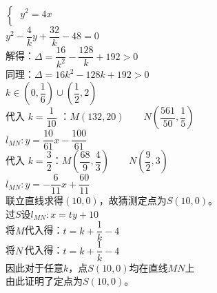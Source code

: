 \documentclass[UTF8]{ctexart}
\begin{document}
\begin{multicols}{2}
\begin{math}
\begin{cases}
                ~y^2 = 4x\\[1mm]
                \end{cases}
        \end{math}\\[5mm]
        $y^2 - \dfrac{4}{k}y + \dfrac{32}{k} - 48 = 0$\\[5mm]
        解得：$\Delta = \dfrac{16}{k^2} - \dfrac{128}{k} + 192 > 0$\\[5mm]
        同理：$\Delta = 16k^2 - 128k + 192 > 0$\\[6mm]
        $k \in (0, \dfrac{1}{6}) \cup  (\dfrac{1}{2}, 2)$\\[8mm]
        代入 $k = \dfrac{1}{10}$ ：$M(132, 20)$~~~~$N(\dfrac{561}{50}, \dfrac{1}{5})$\\[5mm]
        $l_{MN} : y = \dfrac{10}{61}x - \dfrac{100}{61}$\\[8mm]
        代入 $k = \dfrac{3}{2}$：$M(\dfrac{68}{9} , \dfrac{4}{3} )$~~~~$N(\dfrac{9}{2}, 3)$\\[5mm]
        $l_{MN} : y = -\dfrac{6}{11}x + \dfrac{60}{11}$\\[8mm]
        联立直线求得$(10, 0)$，故猜测定点为$S(10, 0)$。\\[8mm]
        过$S$设$l_{MN}:x=ty+10$\\[5mm]
        将$M$代入得：$t = k + \dfrac{1}{k} - 4$\\[5mm]
        将$N\,$代入得：$t = k + \dfrac{1}{k} - 4$\\[5mm]
        因此对于任意$k$，点$S(10,0)$均在直线$MN$上\\[3mm]
        由此证明了定点为$S(10, 0)$。
        \newpage
    \end{multicols}
\end{document}
